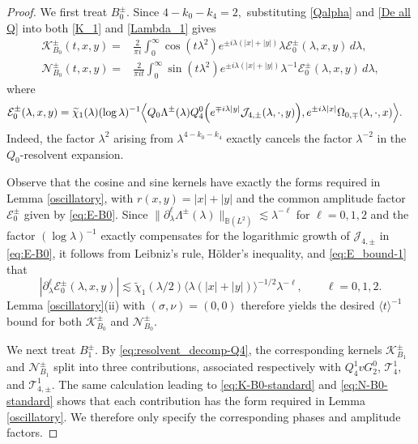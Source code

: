 \documentclass[10pt,a4paper]{amsart}
\begin{document}
\begin{proof}
	We first treat $B_0^\pm$. Since
	$
	4-k_0-k_4=2,
	$
	substituting \eqref{Qalpha} and \eqref{De all Q} into both
	\eqref{K_1} and \eqref{Lambda_1} gives
	\begin{align}
		\mathcal{K}_{B_0}^\pm(t,x,y)
		={}&
		\frac{2}{\pi i}
		\int_0^\infty
		\cos(t\lambda^2)
		e^{\pm i\lambda(|x|+|y|)}
		\lambda
		\mathcal{E}_{0}^\pm(\lambda,x,y)
		\,d\lambda,
		\label{eq:K-B0-standard}\\
			\mathcal{N}_{B_0}^\pm(t,x,y)
		={}&
		\frac{2}{\pi it}
		\int_0^\infty
		\sin(t\lambda^2)
		e^{\pm i\lambda(|x|+|y|)}
		\lambda^{-1}
		\mathcal{E}_{0}^\pm(\lambda,x,y)
		\,d\lambda,
		\label{eq:N-B0-standard}
	\end{align}
	where
	\begin{align}
		\mathcal{E}_{0}^\pm(\lambda,x,y)
		={}&
		\widetilde{\chi}_1(\lambda)
		(\log\lambda)^{-1}
		\Bigl\langle
		Q_0\Lambda^\pm(\lambda)Q_4^0
		\Bigl(
		e^{\mp i\lambda|y|}
		\mathcal{J}_{4,\pm}(\lambda,\cdot,y)
		\Bigr),
		e^{\pm i\lambda|x|}
		\Omega_{0,\mp}(\lambda,\cdot,x)
		\Bigr\rangle.
		\label{eq:E-B0}
	\end{align}
	Indeed, the factor $\lambda^2$ arising from
	$\lambda^{4-k_0-k_4}$ exactly cancels the factor $\lambda^{-2}$
	in the $Q_0$-resolvent expansion.
	
	Observe that  the cosine and sine kernels have exactly the forms required in
	Lemma \ref{oscillatory}, with
	$
	r(x,y)=|x|+|y|
	$
	and the common amplitude factor $\mathcal{E}_{0}^\pm$ given by
	\eqref{eq:E-B0}.
Since $\|\partial_\lambda^\ell \Lambda^\pm(\lambda)\|_{\mathbb{B}(L^2)} \lesssim \lambda^{-\ell}$ for $\ell=0,1,2$ and the factor $(\log\lambda)^{-1}$ exactly compensates for the logarithmic growth of $\mathcal{J}_{4,\pm}$ in \eqref{eq:E-B0}, it follows from Leibniz's rule, H\"older's inequality, and \eqref{eq:E_bound-1} that
	\begin{equation*}
		\left|
		\partial_\lambda^\ell
		\mathcal{E}_{0}^\pm(\lambda,x,y)
		\right|
		\lesssim
		\widetilde{\chi}_1(\lambda/2)
		\langle\lambda(|x|+|y|)\rangle^{-1/2}
		\lambda^{-\ell},
		\qquad
		\ell=0,1,2.
	\end{equation*}
 Lemma
	\ref{oscillatory}(ii) with $(\sigma,\nu)=(0,0)$ therefore yields
	the desired $\langle t\rangle^{-1}$ bound for both
	$\mathcal{K}_{B_0}^\pm$ and $\mathcal{N}_{B_0}^\pm$.
	
	We next treat $B_1^\pm$. By
	\eqref{eq:resolvent_decomp-Q4}, the corresponding kernels 	$\mathcal{K}_{B_1}^\pm$ and $\mathcal{N}_{B_1}^\pm$ split into
	three contributions, associated respectively with
	$Q_4^1vG_2^0$, $\mathcal{T}_4^1$, and
	$\mathcal{T}_{4,\pm}^1$. The same calculation leading to
	\eqref{eq:K-B0-standard} and \eqref{eq:N-B0-standard} shows that each
	contribution has the form required in Lemma \ref{oscillatory}. We
	therefore only specify the corresponding phases and amplitude factors.
	

\end{proof}
\end{document}
